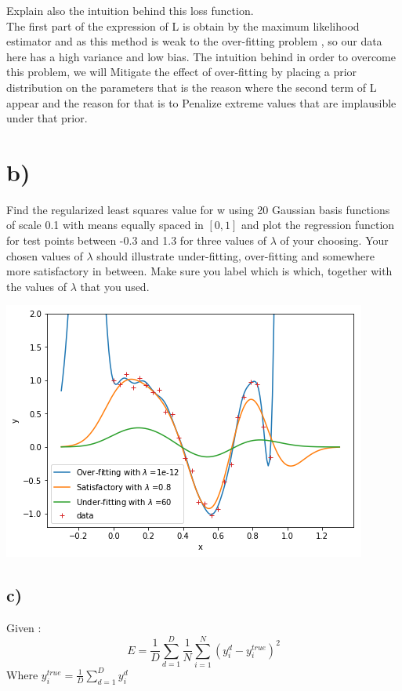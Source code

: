 \documentclass[12pt,twoside]{article}
\begin{document}
Explain also the intuition behind this loss function.\\
The first part of the expression of L is obtain by the maximum likelihood estimator and as this method is weak to the over-fitting problem , so our data here has a high variance and low bias. The intuition behind in order to overcome this problem, we will Mitigate the effect of over-fitting by placing a prior distribution on the parameters that is the reason where the second term of L appear and the reason for that is to Penalize extreme values that are implausible under that prior.

\section*{b)} Find the regularized least squares value for w using 20 Gaussian basis functions of scale 0.1 with means equally spaced in $[0, 1]$ and plot the regression function for test points between -0.3 and 1.3 for three values of $\lambda$ of your choosing. Your chosen values of $\lambda$ should illustrate under-fitting, over-fitting and somewhere more satisfactory in between. Make sure you label which is which, together with
the values of $\lambda$ that you used.

\begin{center}
	\includegraphics{../index3}	     
\end{center}

\subsection*{c)} Given :
\begin{equation*}
E = \frac{1}{D} \sum_{d=1}^{D} \frac{1}{N} \sum_{i=1}^{N} \left(y_i^d - y_i^{true} \right)^2
\end{equation*}
Where $y_i^{true} = \frac{1}{D} \sum_{d=1}^{D} y_i^d$
\end{document}
